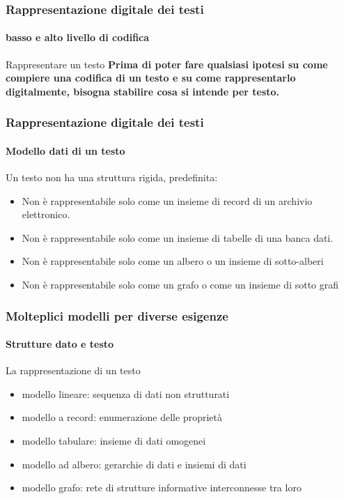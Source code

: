 \begin{frame}
	\frametitle{Rappresentazione digitale dei testi}
	\framesubtitle{basso e alto livello di codifica}
	\addtocounter{nframe}{1}

	\begin{block}{Rappresentare un testo}
		\textbf{
			Prima di poter fare qualsiasi ipotesi su come compiere una codifica di un testo e su come rappresentarlo digitalmente, bisogna stabilire cosa si intende per testo.
		}
	\end{block}

\end{frame}


\begin{frame}
	\frametitle{Rappresentazione digitale dei testi}
	\framesubtitle{Modello dati di un testo}
	\addtocounter{nframe}{1}

	\begin{block}{Un testo non ha una struttura rigida, predefinita: }
		\begin{itemize}

			\item Non è rappresentabile solo come un insieme di record di un archivio elettronico.
			\item Non è rappresentabile solo come un insieme di tabelle di una banca dati.
			\item Non è rappresentabile solo come un albero o un insieme di sotto-alberi
			\item Non è rappresentabile solo come un grafo o come un insieme di sotto grafi

		\end{itemize}

	\end{block}

\end{frame}

\begin{frame}
	\frametitle{Molteplici modelli per diverse esigenze}
	\framesubtitle{Strutture dato e testo}
	\addtocounter{nframe}{1}

	\begin{block}{La rappresentazione di un testo}
		\begin{itemize}
			\item modello lineare: sequenza di dati non strutturati
			\item modello  a record: enumerazione delle proprietà
			\item modello tabulare: insieme di dati omogenei
			\item modello ad albero: gerarchie di dati e insiemi di dati
			\item modello grafo: rete di strutture informative interconnesse tra loro
        \end{itemize}
        
	\end{block}
\end{frame}



